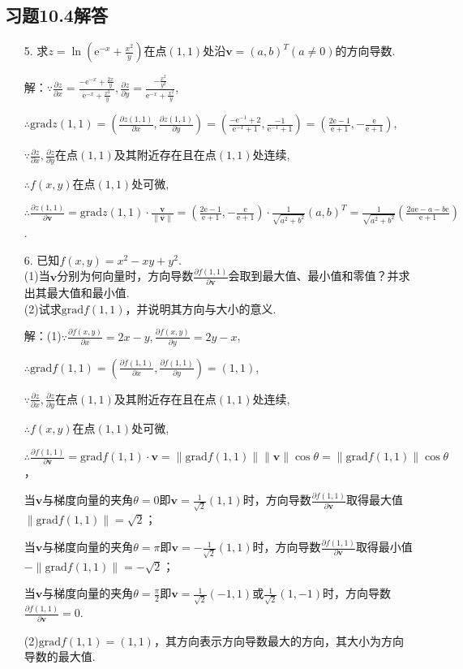 \documentclass[12pt,UTF8]{ctexart}
\begin{document}
\subsection{习题10.4解答}
\begin{enumerate}
\item[5.]求$z=\ln(\mathrm e^{-x}+\frac{x^2}y)$在点$(1,1)$处沿$\bm v=(a,b)^T(a\neq0)$的方向导数.

解：$\because\frac{\partial z}{\partial x}=\frac{-\mathrm e^{-x}+\frac{2x}y}{\mathrm e^{-x}+\frac{x^2}y},\frac{\partial z}{\partial y}=\frac{-\frac{x^2}{y^2}}{\mathrm e^{-x}+\frac{x^2}y}$, 

$\therefore\mathrm{grad}z(1,1)=(\frac{\partial z(1,1)}{\partial x},\frac{\partial z(1,1)}{\partial y})=(\frac{-\mathrm e^{-1}+2}{\mathrm e^{-1}+1},\frac{-1}{\mathrm e^{-1}+1})=(\frac{2\mathrm e-1}{\mathrm e+1},-\frac{\mathrm e}{\mathrm e+1})$,

$\because\frac{\partial z}{\partial x},\frac{\partial z}{\partial y}$在点$(1,1)$及其附近存在且在点$(1,1)$处连续,

$\therefore f(x,y)$在点$(1,1)$处可微,

$\therefore\frac{\partial z(1,1)}{\partial\bm v}=\mathrm{grad}z(1,1)\cdot\frac{\bm v}{\|\bm v\|}=(\frac{2\mathrm e-1}{\mathrm e+1},-\frac{\mathrm e}{\mathrm e+1})\cdot\frac1{\sqrt{a^2+b^2}}(a,b)^T=\frac1{\sqrt{a^2+b^2}}(\frac{2a\mathrm e-a-b\mathrm e}{\mathrm e+1})$.

\item[6.]已知$f(x,y)=x^2-xy+y^2$.\\
(1)当$\bm v$分别为何向量时，方向导数$\frac{\partial f(1,1)}{\partial\bm v}$会取到最大值、最小值和零值？并求出其最大值和最小值.\\
(2)试求$\mathrm{grad}f(1,1)$，并说明其方向与大小的意义.

解：(1)$\because\frac{\partial f(x,y)}{\partial x}=2x-y,\frac{\partial f(x,y)}{\partial y}=2y-x$,

$\therefore\mathrm{grad}f(1,1)=(\frac{\partial f(1,1)}{\partial x},\frac{\partial f(1,1)}{\partial y})=(1,1)$,

$\because\frac{\partial z}{\partial x},\frac{\partial z}{\partial y}$在点$(1,1)$及其附近存在且在点$(1,1)$处连续,

$\therefore f(x,y)$在点$(1,1)$处可微,

$\therefore\frac{\partial f(1,1)}{\partial\bm v}=\mathrm{grad}f(1,1)\cdot\bm v=\|\mathrm{grad}f(1,1)\|\|\bm v\|\cos\theta=\|\mathrm{grad}f(1,1)\|\cos\theta$，

当$\bm v$与梯度向量的夹角$\theta=0$即$\bm v=\frac1{\sqrt2}(1,1)$时，方向导数$\frac{\partial f(1,1)}{\partial\bm v}$取得最大值$\|\mathrm{grad}f(1,1)\|=\sqrt2$；

当$\bm v$与梯度向量的夹角$\theta=\pi$即$\bm v=-\frac1{\sqrt2}(1,1)$时，方向导数$\frac{\partial f(1,1)}{\partial\bm v}$取得最小值$-\|\mathrm{grad}f(1,1)\|=-\sqrt2$；

当$\bm v$与梯度向量的夹角$\theta=\frac\pi2$即$\bm v=\frac1{\sqrt2}(-1,1)$或$\frac1{\sqrt2}(1,-1)$时，方向导数$\frac{\partial f(1,1)}{\partial\bm v}=0$.

(2)$\mathrm{grad}f(1,1)=(1,1)$，其方向表示方向导数最大的方向，其大小为方向导数的最大值.
\end{enumerate}
\end{document}
